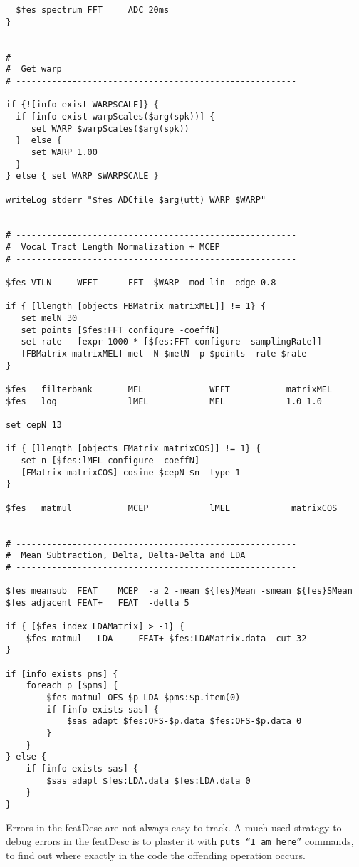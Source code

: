 \begin{verbatim}
  $fes spectrum FFT     ADC 20ms
}


# -------------------------------------------------------
#  Get warp
# -------------------------------------------------------

if {![info exist WARPSCALE]} { 
  if [info exist warpScales($arg(spk))] { 
     set WARP $warpScales($arg(spk))
  }  else {
     set WARP 1.00
  } 
} else { set WARP $WARPSCALE } 

writeLog stderr "$fes ADCfile $arg(utt) WARP $WARP"


# -------------------------------------------------------
#  Vocal Tract Length Normalization + MCEP
# -------------------------------------------------------

$fes VTLN     WFFT      FFT  $WARP -mod lin -edge 0.8

if { [llength [objects FBMatrix matrixMEL]] != 1} {
   set melN 30
   set points [$fes:FFT configure -coeffN]
   set rate   [expr 1000 * [$fes:FFT configure -samplingRate]]
   [FBMatrix matrixMEL] mel -N $melN -p $points -rate $rate
}

$fes   filterbank       MEL             WFFT           matrixMEL
$fes   log              lMEL            MEL            1.0 1.0

set cepN 13

if { [llength [objects FMatrix matrixCOS]] != 1} {
   set n [$fes:lMEL configure -coeffN]
   [FMatrix matrixCOS] cosine $cepN $n -type 1
}

$fes   matmul           MCEP            lMEL            matrixCOS


# -------------------------------------------------------
#  Mean Subtraction, Delta, Delta-Delta and LDA
# -------------------------------------------------------

$fes meansub  FEAT    MCEP  -a 2 -mean ${fes}Mean -smean ${fes}SMean
$fes adjacent FEAT+   FEAT  -delta 5

if { [$fes index LDAMatrix] > -1} {
    $fes matmul   LDA     FEAT+ $fes:LDAMatrix.data -cut 32
}

if [info exists pms] {
    foreach p [$pms] {
        $fes matmul OFS-$p LDA $pms:$p.item(0)
        if [info exists sas] {
            $sas adapt $fes:OFS-$p.data $fes:OFS-$p.data 0
        }
    }
} else {
    if [info exists sas] {
        $sas adapt $fes:LDA.data $fes:LDA.data 0
    }
}

\end{verbatim}

Errors in the featDesc are not always easy to track. A much-used
strategy to debug errors in the featDesc is to plaster it with
\texttt{puts ``I am here''} commands, to find out where exactly in the
code the offending operation occurs.


